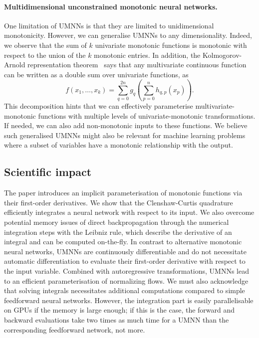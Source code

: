 \paragraph{Multidimensional unconstrained monotonic neural networks.}
One limitation of UMNNs is that they are limited to unidimensional monotonicity. However, we can generalise UMNNs to any dimensionality. Indeed, we observe that the sum of $k$ univariate monotonic functions is monotonic with respect to the union of the $k$ monotonic entries. In addition, the Kolmogorov-Arnold representation theorem~\citep{kolmogorov1956representation, arnold2009functions} says that any multivariate continuous function can be written as a double sum over univariate functions, as
$$ f(x_1, \dots, x_k) = \sum_{q=0}^{2n}g_q\left( \sum_{p=0}^{n} h_{q,p}(x_p) \right). $$
This decomposition hints that we can effectively parameterise multivariate-monotonic functions with multiple levels of univariate-monotonic transformations. If needed, we can also add non-monotonic inputs to these functions. We believe such generalised UMNNs might also be relevant for machine learning problems where a subset of variables have a monotonic relationship with the output.

\subsection{Scientific impact}
The paper introduces an implicit parameterisation of monotonic functions via their first-order derivatives. We show that the Clenshaw-Curtis quadrature efficiently integrates a neural network with respect to its input. We also overcome potential memory issues of direct backpropagation through the numerical integration steps with the Leibniz rule, which describe the derivative of an integral and can be computed on-the-fly. In contrast to alternative monotonic neural networks, UMNNs are continuously differentiable and do not necessitate automatic differentiation to evaluate their first-order derivative with respect to the input variable. Combined with autoregressive transformations, UMNNs lead to an efficient parameterisation of normalizing flows. We must also acknowledge that solving integrals necessitates additional computations compared to simple feedforward neural networks. However, the integration part is easily parallelisable on GPUs if the memory is large enough; if this is the case, the forward and backward evaluations take two times as much time for a UMNN than the corresponding feedforward network, not more.


